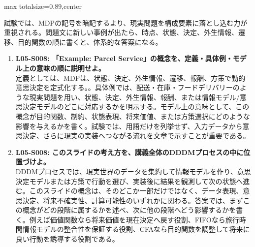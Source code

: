 \begin{minipage}[t]{0.58\textwidth}
\begin{adjustbox}{max totalsize={\textwidth}{0.89\textheight},center}
\begin{minipage}{\textwidth}
試験では、MDPの記号を暗記するより、現実問題を構成要素に落とし込む力が重視される。問題文に新しい事例が出たら、時点、状態、決定、外生情報、遷移、目的関数の順に書くと、体系的な答案になる。\par{}\begin{enumerate}\item \textbf{L05-S008: 「Example: Parcel Service」の概念を、定義・具体例・モデル上の意味の順に説明せよ。}\\定義としては、MDPは、状態、決定、外生情報、遷移、報酬、方策で動的意思決定を定式化する。。具体例では、配送・在庫・フードデリバリーのような現実問題を用い、状態、決定、外生情報、報酬、または情報モデル/意思決定モデルのどこに対応するかを明示する。モデル上の意味として、この概念が目的関数、制約、状態表現、将来価値、または方策選択にどのような影響を与えるかを書く。試験では、用語だけを列挙せず、入力データから意思決定、さらに現実の実装へつながる流れを文章で示すことが重要である。\item \textbf{L05-S008: このスライドの考え方を、講義全体のDDDMプロセスの中に位置づけよ。}\\DDDMプロセスでは、現実世界のデータを集約して情報モデルを作り、意思決定モデルまたは方策で行動を選び、実装後に結果を観測して次の状態へ進む。このスライドの概念は、そのどこか一部だけではなく、データ表現、意思決定、将来不確実性、計算可能性のいずれかに関わる。答案では、まずこの概念がどの段階に属するかを述べ、次に他の段階へどう影響するかを書く。例えば価値関数なら将来価値を現在決定へ戻す役割、FIFOなら旅行時間情報モデルの整合性を保証する役割、CFAなら目的関数を調整して将来に良い行動を誘導する役割である。\end{enumerate}
\end{minipage}
\end{adjustbox}
\end{minipage}



